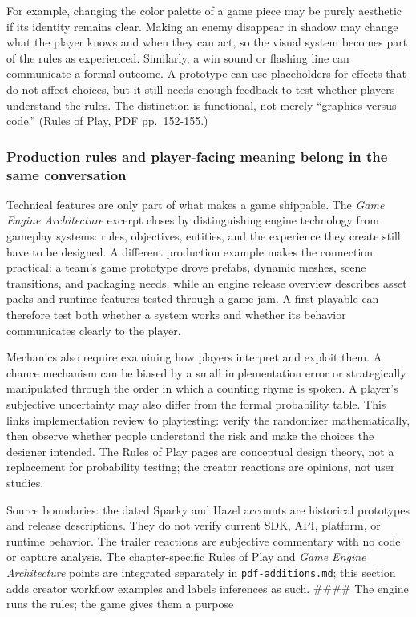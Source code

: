 For example, changing the color palette of a game piece may be purely aesthetic if its identity remains clear. Making an enemy disappear in shadow may change what the player knows and when they can act, so the visual system becomes part of the rules as experienced. Similarly, a win sound or flashing line can communicate a formal outcome. A prototype can use placeholders for effects that do not affect choices, but it still needs enough feedback to test whether players understand the rules. The distinction is functional, not merely ``graphics versus code.'' (Rules of Play, PDF pp.~152-155.)

\subsubsection{Production rules and player-facing meaning belong in the same conversation}\label{05-engine-i-ch009-production-rules-and-player-facing-meaning-belong-in-the-same-conversation}

Technical features are only part of what makes a game shippable. The \emph{Game Engine Architecture} excerpt closes by distinguishing engine technology from gameplay systems: rules, objectives, entities, and the experience they create still have to be designed. A different production example makes the connection practical: a team's game prototype drove prefabs, dynamic meshes, scene transitions, and packaging needs, while an engine release overview describes asset packs and runtime features tested through a game jam. A first playable can therefore test both whether a system works and whether its behavior communicates clearly to the player.

Mechanics also require examining how players interpret and exploit them. A chance mechanism can be biased by a small implementation error or strategically manipulated through the order in which a counting rhyme is spoken. A player's subjective uncertainty may also differ from the formal probability table. This links implementation review to playtesting: verify the randomizer mathematically, then observe whether people understand the risk and make the choices the designer intended. The Rules of Play pages are conceptual design theory, not a replacement for probability testing; the creator reactions are opinions, not user studies.

Source boundaries: the dated Sparky and Hazel accounts are historical prototypes and release descriptions. They do not verify current SDK, API, platform, or runtime behavior. The trailer reactions are subjective commentary with no code or capture analysis. The chapter-specific Rules of Play and \emph{Game Engine Architecture} points are integrated separately in \texttt{pdf-additions.md}; this section adds creator workflow examples and labels inferences as such. \#\#\#\# The engine runs the rules; the game gives them a purpose

